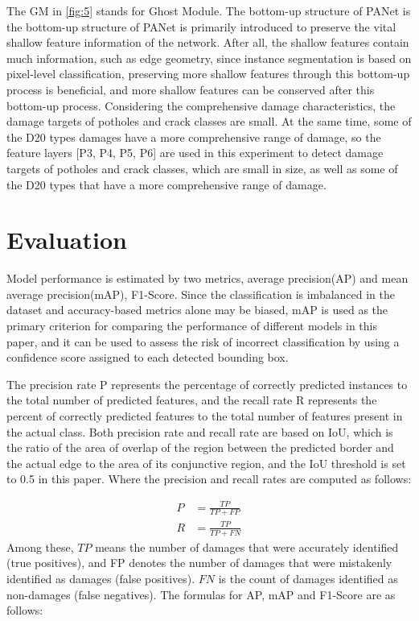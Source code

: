 \documentclass[sensors,article,submit,moreauthors]{Definitions/mdpi}
\begin{document}
    The GM in \autoref{fig:5} stands for Ghost Module\citep{Han_2020_CVPR}. The bottom-up structure of PANet is the bottom-up structure of PANet is primarily introduced to preserve the vital shallow feature information of the network. After all, the shallow features contain much information, such as edge geometry, since instance segmentation is based on pixel-level classification, preserving more shallow features through this bottom-up process is beneficial, and more shallow features can be conserved after this bottom-up process. Considering the comprehensive damage characteristics, the damage targets of potholes and crack classes are small. At the same time, some of the D20 types damages have a more comprehensive range of damage, so the feature layers [P3, P4, P5, P6] are used in this experiment to detect damage targets of potholes and crack classes, which are small in size, as well as some of the D20 types that have a more comprehensive range of damage.



    \section{Evaluation}


    Model performance is estimated by two metrics, average precision(AP) and mean average precision(mAP), F1-Score. Since the classification is imbalanced in the dataset and accuracy-based metrics alone may be biased, mAP is used as the primary criterion for comparing the performance of different models in this paper, and it can be used to assess the risk of incorrect classification by using a confidence score assigned to each detected bounding box.

    The precision rate P represents the percentage of correctly predicted instances to the total number of predicted features, and the recall rate R represents the percent of correctly predicted features to the total number of features present in the actual class. Both precision rate and recall rate are based on IoU, which is the ratio of the area of overlap of the region between the predicted border and the actual edge to the area of its conjunctive region, and the IoU threshold is set to 0.5 in this paper. Where the precision and recall rates are computed as follows:

    \begin{align}
        P &= \frac{TP}{TP+FP} \\
        R &= \frac{TP}{TP+FN}
    \end{align}
    Among these, $TP$ means the number of damages that were accurately identified (true positives), and FP denotes the number of damages that were mistakenly identified as damages (false positives). $FN$ is the count of damages identified as non-damages (false negatives).
    The formulas for AP, mAP and F1-Score are as follows:
\end{document}
